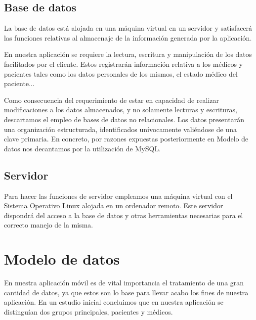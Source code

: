 \documentclass[11pt,spanish,
		listoftables,listoffigures]
		{tfgplantilla}
\begin{document}
\newpage
\section {Base de datos}

La base de datos está alojada en una máquina virtual en un servidor y satisfacerá las funciones relativas al almacenaje de la información generada por la aplicación. 

En nuestra aplicación se requiere la lectura, escritura y manipulación de los datos facilitados por el cliente. Estos registrarán información relativa a los médicos y pacientes tales como los datos personales de los mismos, el estado médico del paciente...

Como consecuencia del requerimiento de estar en capacidad de realizar modificaciones a los datos almacenados, y no solamente lecturas y escrituras, descartamos el empleo de bases de datos no relacionales. Los datos presentarán una organización estructurada, identificados unívocamente valiéndose de una clave primaria. En concreto, por razones expuestas posteriormente en Modelo de datos nos decantamos por la utilización de MySQL.

\section {Servidor}

Para hacer las funciones de servidor empleamos una máquina virtual con el Sistema Operativo Linux alojada en un ordenador remoto. Este servidor dispondrá del acceso a la base de datos y otras herramientas necesarias para el correcto manejo de la misma.


\chapter{Modelo de datos}

En nuestra aplicación móvil es de vital importancia el tratamiento de una gran cantidad de datos, ya que estos son lo base para llevar acabo los fines de nuestra aplicación. En un estudio inicial concluimos que en nuestra aplicación se distinguían dos grupos principales, pacientes y médicos. 
\end{document}
